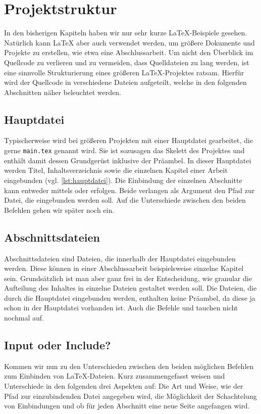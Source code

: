 \section{Projektstruktur}
\label{sec:projektstruktur}
In den bisherigen Kapiteln haben wir nur sehr kurze \LaTeX{}-Beispiele gesehen. Natürlich kann \LaTeX{} aber auch verwendet werden, um größere Dokumente und Projekte zu erstellen, wie etwa eine Abschlussarbeit. 
Um nicht den Überblick im Quellcode zu verlieren und zu vermeiden, dass Quelldateien zu lang werden, ist eine sinnvolle Strukturierung eines größeren \LaTeX{}-Projektes ratsam. Hierfür wird der Quellcode in verschiedene Dateien aufgeteilt, welche in den folgenden Abschnitten näher beleuchtet werden.

 \subsection{Hauptdatei} Typischerweise wird bei größeren Projekten mit einer Hauptdatei gearbeitet, die gerne \texttt{main.tex} genannt wird. Sie ist sozusagen das Skelett des Projektes und enthält damit dessen Grundgerüst inklusive der Präambel. In dieser Hauptdatei werden Titel, Inhaltsverzeichnis sowie die einzelnen Kapitel einer Arbeit eingebunden (vgl. \cref{lst:hauptdatei}). Die Einbindung der einzelnen Abschnitte kann entweder mittels \texttt{} oder \texttt{} erfolgen. Beide verlangen als Argument den Pfad zur Datei, die eingebunden werden soll. Auf die Unterschiede zwischen den beiden Befehlen gehen wir später noch ein.
  
 
 \subsection{Abschnittsdateien}
 Abschnittsdateien sind Dateien, die innerhalb der Hauptdatei eingebunden werden. Diese können in einer Abschlussarbeit beispielsweise einzelne Kapitel sein. Grundsätzlich ist man aber ganz frei in der Entscheidung, wie granular die Aufteilung des Inhaltes in einzelne Dateien gestaltet werden soll.
 Die Dateien, die durch die Hauptdatei eingebunden werden, enthalten keine Präambel, da diese ja schon in der Hauptdatei vorhanden ist. Auch die Befehle \texttt{} und \texttt{} tauchen nicht nochmal auf.
 
 \subsection{Input oder Include?}
Kommen wir nun zu den Unterschieden zwischen den beiden möglichen Befehlen zum Einbinden von \LaTeX-Dateien. Kurz zusammengefasst weisen \texttt{} und \texttt{} Unterschiede in den folgenden drei Aspekten auf: Die Art und Weise, wie der Pfad zur einzubindenden Datei angegeben wird, die Möglichkeit der Schachtelung von Einbindungen und ob für jeden Abschnitt eine neue Seite angefangen wird.
 
